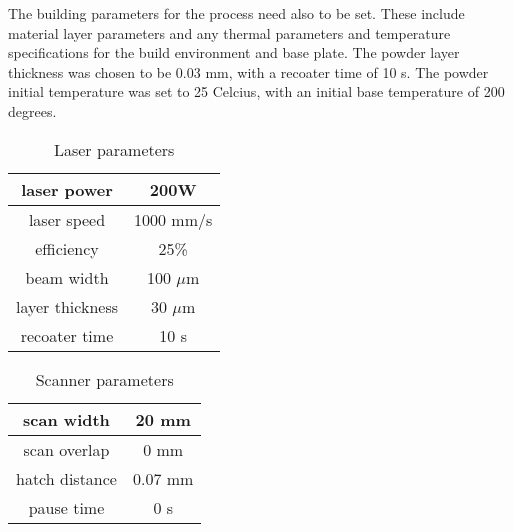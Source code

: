 \documentclass[../main.tex]{subfiles}
\begin{document}
The building parameters for the process need also to be set. These include material layer parameters and any thermal parameters and temperature specifications for the build environment and base plate. The powder layer thickness was chosen to be 0.03 mm, with a recoater time of 10 s. The powder initial temperature was set to 25 \degree Celcius, with an initial base temperature of 200 degrees. 




\begin{table}
  \centering
  \begin{tabular}{ |c|c| }
    \hline
    laser power & 200W \\
    \hline
    laser speed & 1000 mm/s \\
    \hline
    efficiency & 25\% \\
    \hline
    beam width & 100 $\mu$m \\
    \hline
    layer thickness & 30 $\mu$m \\
    \hline
    recoater time & 10 s \\
    \hline
  \end{tabular}
  \caption{Laser parameters}
  \label{tab:laser_params}
\end{table}

\begin{table}
  \centering
  \begin{tabular}{ |c|c| }
    \hline
    scan width & 20 mm \\
    \hline
    scan overlap & 0 mm \\
    \hline
    hatch distance & 0.07 mm \\
    \hline
    pause time & 0 s \\
    \hline
  \end{tabular}
  \caption{Scanner parameters}
  \label{tab:scanner_params}
\end{table}
\end{document}
